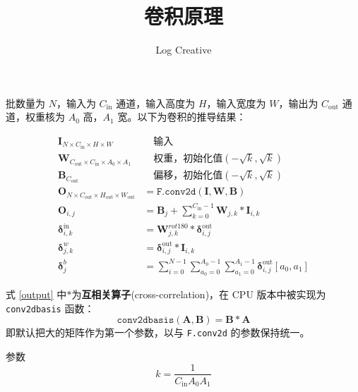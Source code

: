\documentclass{ctexart}
\begin{document}
    \title{卷积原理}
    \author{Log Creative}
    \date{}
    \maketitle

    批数量为 $N$，输入为 $C_\text{in}$ 通道，输入高度为 $H$，输入宽度为 $W$，输出为 $C_\text{out}$ 通道，权重核为 $A_0$ 高，$A_1$ 宽。以下为卷积的推导结果\cite{gate}：

    \begin{align}
        \mathbf{I}_{N\times C_\text{in}\times H\times W}&\quad\text{输入}\nonumber\\
        \mathbf{W}_{C_\text{out}\times C_\text{in}\times A_0\times A_1}&\quad\text{权重，初始化值}(-\sqrt{k},\sqrt{k})\nonumber\\
        \mathbf{B}_{C_\text{out}}&\quad\text{偏移，初始化值}(-\sqrt{k},\sqrt{k})\nonumber\\
        \mathbf{O}_{N\times C_\text{out}\times H_\text{out}\times W_\text{out}}&=\texttt{F.conv2d}(\mathbf{I},\mathbf{W},\mathbf{B})\\
        \mathbf{O}_{i,j}&=\mathbf{B}_j+\sum_{k=0}^{C_\text{in}-1}\mathbf{W}_{j,k}*\mathbf{I}_{i,k}\label{output}\\
        \mathbf{\delta}^\text{in}_{i,k}&=\mathbf{W}^{rot180}_{j,k}*\mathbf{\delta}^\text{out}_{i,j}\label{deltain}\\
        \mathbf{\delta}^{w}_{j,k}&=\mathbf{\delta}^\text{out}_{i,j}*\mathbf{I}_{i,k}\label{deltaweight}\\
        \mathbf{\delta}^{b}_{j}&=\sum_{i=0}^{N-1}\sum_{a_0=0}^{A_0-1}\sum_{a_1=0}^{A_1-1}\mathbf{\delta}^\text{out}_{i,j}[a_0,a_1]\label{deltabia}
    \end{align}

    式 \eqref{output} 中$*$为\textbf{互相关算子}(cross-correlation)，在 CPU 版本中被实现为 \verb"conv2dbasis" 函数：
    \begin{equation}
        \texttt{conv2dbasis}(\mathbf{A},\mathbf{B}) = \mathbf{B}*\mathbf{A}
    \end{equation}
    即默认把大的矩阵作为第一个参数，以与 \verb"F.conv2d" 的参数保持统一。

    参数
    \begin{equation}
        k=\frac{1}{C_\text{in}A_0A_1}
    \end{equation}
    
\end{document}

